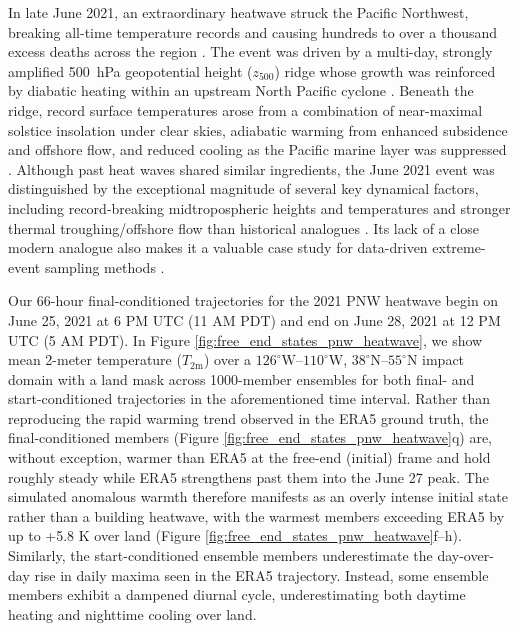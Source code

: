 \documentclass[final]{agujournal2019}
\begin{document}
In late June 2021, an extraordinary heatwave struck the Pacific Northwest, breaking all-time temperature records and causing hundreds to over a thousand excess deaths across the region \cite{Neal2022-wk, White2023-fd, Mass2024-zq}. The event was driven by a multi-day, strongly amplified 500~hPa geopotential height ($z_{500}$) ridge whose growth was reinforced by diabatic heating within an upstream North Pacific cyclone \cite{Neal2022-wk, Schumacher2022-gb}. Beneath the ridge, record surface temperatures arose from a combination of near-maximal solstice insolation under clear skies, adiabatic warming from enhanced subsidence and offshore flow, and reduced cooling as the Pacific marine layer was suppressed \cite{Neal2022-wk, Schumacher2022-gb, White2023-fd, Loikith2023-nt, Mass2024-zq, Ndoping2026-sc}. Although past heat waves shared similar ingredients, the June 2021 event was distinguished by the exceptional magnitude of several key dynamical factors, including record-breaking midtropospheric heights and temperatures and stronger thermal troughing/offshore flow than historical analogues \cite{Loikith2023-nt, Mass2024-zq}. Its lack of a close modern analogue also makes it a valuable case study for data-driven extreme-event sampling methods \cite{Mahesh2025-py, Whittaker2026-fe}.

Our 66-hour final-conditioned trajectories for the 2021 PNW heatwave begin on June 25, 2021 at 6 PM UTC (11 AM PDT) and end on June 28, 2021 at 12 PM UTC (5 AM PDT). In Figure \ref{fig:free_end_states_pnw_heatwave}, we show mean 2-meter temperature ($T_{\mathrm{2m}}$) over a $126^{\circ}\mathrm{W}$--$110^{\circ}\mathrm{W}$, $38^{\circ}\mathrm{N}$--$55^{\circ}\mathrm{N}$ impact domain with a land mask across 1000-member ensembles for both final- and start-conditioned trajectories in the aforementioned time interval. Rather than reproducing the rapid warming trend observed in the ERA5 ground truth, the final-conditioned members (Figure \ref{fig:free_end_states_pnw_heatwave}q) are, without exception, warmer than ERA5 at the free-end (initial) frame and hold roughly steady while ERA5 strengthens past them into the June 27 peak. The simulated anomalous warmth therefore manifests as an overly intense initial state rather than a building heatwave, with the warmest members exceeding ERA5 by up to +5.8 K over land (Figure \ref{fig:free_end_states_pnw_heatwave}f--h). Similarly, the start-conditioned ensemble members underestimate the day-over-day rise in daily maxima seen in the ERA5 trajectory. Instead, some ensemble members exhibit a dampened diurnal cycle, underestimating both daytime heating and nighttime cooling over land.
\end{document}
